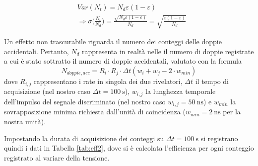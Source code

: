\documentclass[10pt,a4paper]{article}
\begin{document}
\begin{align}
    &Var(N_t)=N_d\varepsilon(1-\varepsilon)\\
    &\Longrightarrow \sigma\biggl(\frac{N_t}{N_d}\biggr)=\frac{\sqrt{N_d\varepsilon(1-\varepsilon)}}{N_d}=\sqrt{\frac{\varepsilon(1-\varepsilon)}{N_d}}\label{sigma}
\end{align}

Un effetto non trascurabile riguarda il numero dei conteggi delle doppie accidentali. Pertanto, $N_d$ rappresenta in realtà nelle il numero di doppie registrate a cui è stato sottratto il numero di doppie accidentali, valutato con la formula
\begin{equation}
    N_{doppie,acc}=R_i\cdot R_j\cdot\Delta t (w_i+w_j-2\cdot w_{min})
\end{equation}
dove $R_{i,j}$ rappresentano i rate in singola dei due rivelatori, $\Delta t$ il tempo di acquisizione (nel nostro caso $\Delta t=\SI{100}{\second}$), $w_{i,j}$ la lunghezza temporale dell'impulso del segnale discriminato (nel nostro caso $w_{i,j}=\SI{50}{\nano\second}$) e $w_{min}$ la sovrapposizione minima richiesta dall'unità di coincidenza ($w_{min}=\SI{2}{\nano\second}$ per la nostra unità).

Impostando la durata di acquisizione dei conteggi su $\Delta t=\SI{100}{\second}$ si registrano quindi i dati in Tabella \ref{tab:eff2}, dove si è calcolata l'efficienza per ogni conteggio registrato al variare della tensione.
\end{document}

